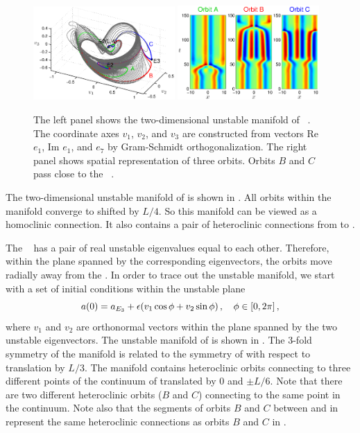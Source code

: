 \begin{figure}[h]
\begin{center}
\includegraphics[width=0.48\textwidth]{figs/ks22_E2_manifold.eps}%
\includegraphics[width=0.48\textwidth]{figs/ks22_E2_orbits.eps}
\end{center}
\caption{
The left panel shows the two-dimensional
unstable manifold of \eqv\ . The coordinate axes
$v_1$, $v_2$, and $v_3$ are constructed from vectors
Re $e_1$, Im $e_1$, and $e_7$ by Gram-Schmidt orthogonalization.
The right panel shows spatial representation of three orbits. Orbits
$B$ and $C$ pass close to the \eqv\ .}
\label{f:KS22E2man}
\end{figure}

The two-dimensional unstable manifold of  is shown in
.  All orbits within the manifold converge
to  shifted by $L/4$.  So this manifold can be viewed as a homoclinic
connection.  It also contains a pair of heteroclinic connections from
 to .

The \eqv\  has a pair of real unstable eigenvalues
equal to each other.  Therefore, within the plane spanned by the
corresponding eigenvectors, the orbits move radially away from
the \eqv.  In order to trace out the unstable manifold,
we start with a set of initial conditions within the unstable plane
\[ a(0) = a_{{E_{3}}} + \epsilon(v_1 \cos \phi + v_2 \sin \phi)\,,
  \quad\phi\in[0,2\pi]\,, \]
where $v_1$ and $v_2$ are orthonormal vectors within the
plane spanned by the two unstable eigenvectors.  The unstable manifold
of  is shown in .  The 3-fold symmetry of
the manifold is related to the symmetry of  with respect to
translation by $L/3$.  The manifold contains heteroclinic orbits
connecting  to three different points of the continuum of {\eqva}
translated by 0 and $\pm L/6$.  Note that there are two different
heteroclinic orbits ($B$ and $C$) connecting  to the same point in the
 continuum.  Note also that the segments of orbits $B$ and $C$
between  and  in 
represent the same heteroclinic connections as orbits $B$ and $C$ in
.

